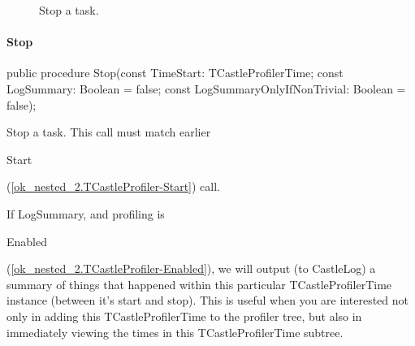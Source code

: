 \documentclass{report}
\newif\ifpdf
\begin{document}
\begin{list}{}
\item[\textbf{See also}]
\begin{description}
\item[\begin{ttfamily}Stop\end{ttfamily}(\ref{ok_nested_2.TCastleProfiler-Stop})] 
Stop a task.
\end{description}


\end{list}
\paragraph*{Stop}\hspace*{\fill}

\label{ok_nested_2.TCastleProfiler-Stop}
\begin{list}{}{
\setlength{\itemindent}{0cm}
\setlength{\listparindent}{0cm}
\setlength{\leftmargin}{\evensidemargin}
\addtolength{\leftmargin}{\tmplength}
\settowidth{\labelsep}{X}
\addtolength{\leftmargin}{\labelsep}
\setlength{\labelwidth}{\tmplength}
}
\item[\textbf{Declaration}\hfill]
\ifpdf
\begin{flushleft}
\fi
\begin{ttfamily}
public procedure Stop(const TimeStart: TCastleProfilerTime; const LogSummary: Boolean = false; const LogSummaryOnlyIfNonTrivial: Boolean = false);\end{ttfamily}

\ifpdf
\end{flushleft}
\fi

\par
\item[\textbf{Description}]
Stop a task. This call must match earlier \begin{ttfamily}Start\end{ttfamily}(\ref{ok_nested_2.TCastleProfiler-Start}) call.

If LogSummary, and profiling is \begin{ttfamily}Enabled\end{ttfamily}(\ref{ok_nested_2.TCastleProfiler-Enabled}), we will output (to CastleLog) a summary of things that happened within this particular TCastleProfilerTime instance (between it's start and stop). This is useful when you are interested not only in adding this TCastleProfilerTime to the profiler tree, but also in immediately viewing the times in this TCastleProfilerTime subtree.


\end{list}
\end{document}
